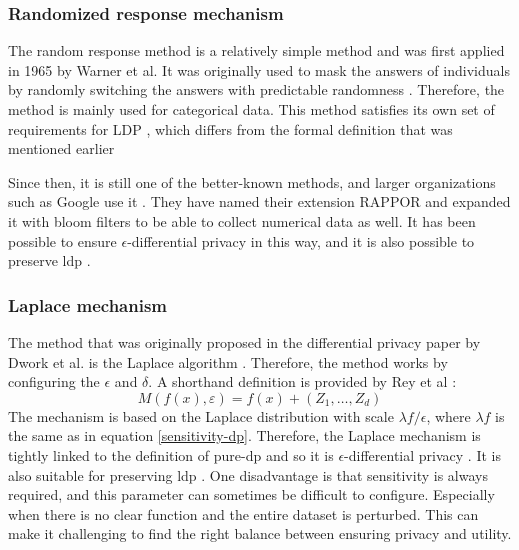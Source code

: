 \subsubsection{Randomized response mechanism}
The random response method is a relatively simple method and was first applied in 1965 by Warner et al.
It was originally used to mask the answers of individuals by randomly switching the answers with predictable randomness \citep{warner_randomized_1965}.
Therefore, the method is mainly used for categorical data.
This method satisfies its own set of requirements for LDP \citep{del_rey_comprehensive_2020}, which differs from the formal definition that was mentioned earlier

Since then, it is still one of the better-known methods, and larger organizations such as Google use it \citep{erlingsson_rappor_2014}.
They have named their extension RAPPOR and expanded it with bloom filters to be able to collect numerical data as well.
It has been possible to ensure $\epsilon$-differential privacy in this way, and it is also possible to preserve \gls{ldp} \citep{del_rey_comprehensive_2020}.
\subsubsection{Laplace mechanism} \label{laplace}
The method that was originally proposed in the differential privacy paper by Dwork et al. is the Laplace algorithm \citep{dwork_differential_2006}.
Therefore, the method works by configuring the $\epsilon$ and $\delta$. A shorthand definition is provided by Rey et al \citep{del_rey_comprehensive_2020}:
\begin{equation}
  M\left(f\left(x\right),\varepsilon\right)=f\left(x\right)+\left(Z_{1},\ldots,Z_{d}\right)
\end{equation}
The mechanism is based on the Laplace distribution with scale $\lambda f/\epsilon$, where $\lambda f$ is the same as in equation \ref{sensitivity-dp}.
Therefore, the Laplace mechanism is tightly linked to the definition of pure-dp and so it is $\epsilon$-differential privacy \citep{dwork_differential_2006}.
It is also suitable for preserving \gls{ldp} \citep{del_rey_comprehensive_2020}.
One disadvantage is that sensitivity is always required, and this parameter can sometimes be difficult to configure.
Especially when there is no clear function and the entire dataset is perturbed.
This can make it challenging to find the right balance between ensuring privacy and utility.

